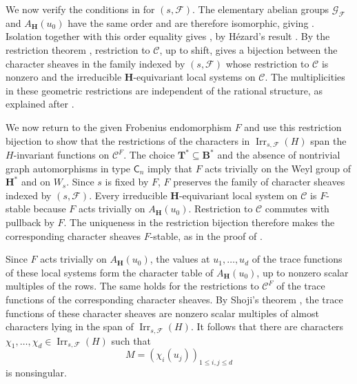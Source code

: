 \documentclass[10pt]{amsart}
\theoremstyle{definition}
\renewcommand{\leq}{\leqslant}
\let\oldendproof\endproof
\renewenvironment{proof}[1][\proofname]{%
  \oldproof[\bfseries #1]%
}{\oldendproof}
\DeclareMathOperator{\Irr}{Irr}
\numberwithin{equation}{section}
\numberwithin{table}{section}
\begin{document}
\begin{proof}[Proof of Lemma~\ref{lem:type-b-isolated-coverage}]
We now verify the conditions in \cite[(4.4)(a)--(b)]{Geck1999GGGR} for $(s,\mathcal F)$.
The elementary abelian groups $\mathcal G_{\mathcal F}$ and
$A_{\mathbf H}(u_0)$ have the same order and are therefore isomorphic,
giving \cite[(4.4)(a)]{Geck1999GGGR}. Isolation together with
this order equality gives \cite[(4.4)(b)]{Geck1999GGGR}, by H\'ezard's
result \cite[Proposition~2.3]{GeckHezard2008}. By the restriction theorem \cite[Theorem~4.5]{Geck1999GGGR}, restriction to
$\mathcal C$, up to shift, gives a bijection between the character sheaves in
the family indexed by $(s,\mathcal F)$ whose restriction to $\mathcal C$ is
nonzero and the irreducible $\mathbf H$-equivariant local systems on $\mathcal
C$. The multiplicities
in these geometric restrictions are independent of the rational structure,
as explained after \cite[Theorem~4.5]{Geck1999GGGR}.

We now return to the given Frobenius endomorphism $F$ and use this restriction
bijection to show that the restrictions of the characters in
$\Irr_{s,\mathcal F}(H)$ span the $H$-invariant functions on $\mathcal C^F$.
The choice $\mathbf T^*\subseteq\mathbf B^*$ and the absence of nontrivial
graph automorphisms in type $\mathsf C_n$ imply that $F$ acts trivially
on the Weyl group of $\mathbf H^*$ and on $W_s$. Since $s$ is fixed by $F$,
$F$ preserves the family of character sheaves indexed by $(s,\mathcal F)$.
Every irreducible $\mathbf H$-equivariant local system on $\mathcal C$ is
$F$-stable because $F$ acts trivially on $A_{\mathbf H}(u_0)$.
Restriction to $\mathcal C$ commutes with pullback by $F$.
The uniqueness in the restriction bijection therefore makes the corresponding
character sheaves $F$-stable, as in the proof of
\cite[Corollary~3.5]{GeckHezard2008}.

Since $F$ acts trivially on $A_{\mathbf H}(u_0)$, the values at
$u_1,\ldots,u_d$ of the trace functions of these local systems form the
character table of $A_{\mathbf H}(u_0)$, up to nonzero scalar multiples
of the rows. The same holds for the restrictions to $\mathcal C^F$ of
the trace functions of the corresponding character sheaves.
By Shoji's theorem \cite[Theorem~3.2]{Shoji1995II}, the trace functions
of these character sheaves are nonzero scalar multiples of almost
characters lying in the span of $\Irr_{s,\mathcal F}(H)$. It follows that there are characters
$\chi_1,\ldots,\chi_d\in\Irr_{s,\mathcal F}(H)$ such that
\[
 M=(\chi_i(u_j))_{1\leq i,j\leq d}
\]
is nonsingular.


\end{proof}
\end{document}
